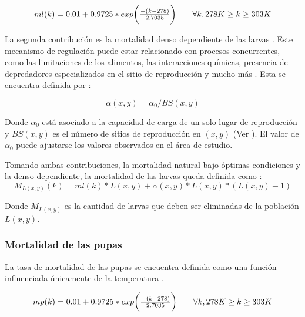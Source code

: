 \begin{equation}
\label{eq:mortalidad-natural-larvas}
 \begin{array}{l l}
    ml(k) = 0.01 + 0.9725 * exp\bigg( \frac{-(k - 278)}{2.7035}\bigg) &\quad  \forall k, 278 K \geq k \geq 303 K\\
\end{array}
\end{equation}

La segunda contribución es la mortalidad denso dependiente de las larvas \cite{otero2006stochastic}
. Este mecanismo de regulación puede estar relacionado con procesos concurrentes, como las
limitaciones de los alimentos, las interacciones químicas, presencia de depredadores
especializados en el sitio de reproducción y mucho más \cite{otero2006stochastic}. Esta se
encuentra definida por :

\begin{equation}
  \alpha (x,y) = \alpha _{0}/BS(x,y)
\end{equation}

Donde $\alpha _{0}$ está asociado a la capacidad de carga de un solo lugar de reproducción y
$BS(x,y)$ es el número de sitios de reproducción en $(x,y)$ (Ver
). El valor de $\alpha _{0}$ puede ajustarse los
valores observados en el área de estudio.

Tomando ambas contribuciones, la mortalidad natural bajo óptimas condiciones y la denso
dependiente, la mortalidad de las larvas queda definida como :
\begin{equation}
    M_{L(x,y)}(k) = ml(k) * L(x,y) + \alpha (x,y) * L(x,y) *(L(x,y) - 1)
\end{equation}

Donde $M_{L(x,y)}$ es la cantidad de larvas que deben ser eliminadas de la población $L(x,y)$.

\subsubsection{Mortalidad de las pupas}
La tasa de mortalidad de las pupas se encuentra definida como una función influenciada únicamente
de la temperatura \cite{otero2006stochastic}.

\begin{equation}
\label{eq:mortalidad-natural-pupas}
 \begin{array}{l l}
    mp(k) = 0.01 + 0.9725 * exp\bigg( \frac{-(k - 278)}{2.7035}\bigg) &\quad  \forall k, 278 K \geq k \geq 303 K\\
\end{array}
\end{equation}

